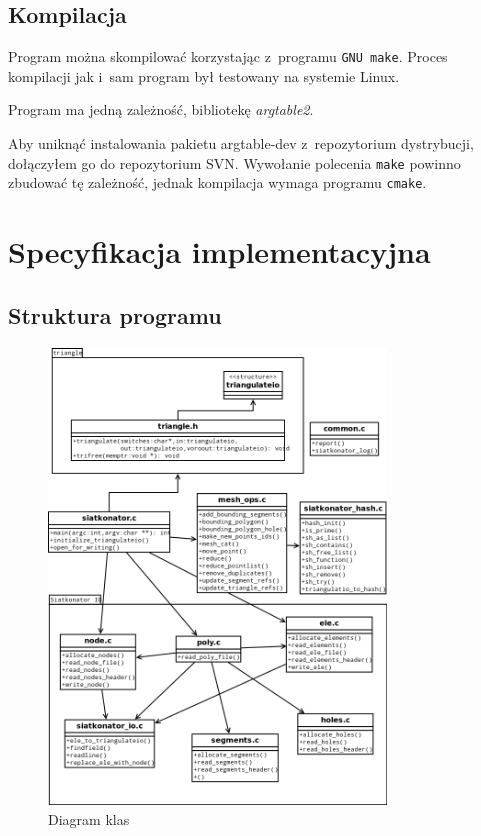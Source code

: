 \documentclass[a4paper]{article} \usepackage{setspace}
\begin{document}
\subsection{Kompilacja}
Program można skompilować korzystając z~programu \texttt{GNU make}.
Proces kompilacji jak i~sam program był testowany na systemie Linux.

Program ma jedną zależność, bibliotekę \emph{argtable2}.

Aby uniknąć instalowania pakietu argtable-dev z~repozytorium dystrybucji, dołączyłem go do repozytorium SVN.
Wywołanie polecenia \texttt{make} powinno zbudować tę zależność, jednak kompilacja wymaga programu \texttt{cmake}.

\section{Specyfikacja implementacyjna}
\subsection{Struktura programu}

\begin{figure}[h]
  \centering
  \includegraphics[width=0.8\textwidth]{class.png}
  \caption{Diagram klas}
\end{figure}
\end{document}
